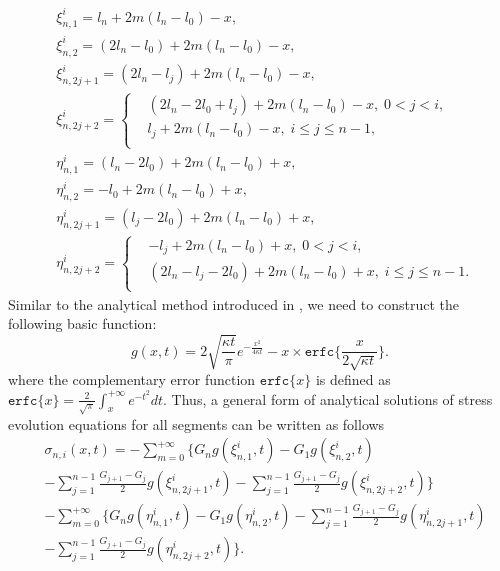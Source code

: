 \begin{equation} \label{generalNotations}
\begin{split}
&\xi_{n,1}^{i}=l_n+2m(l_n-l_0)-x,\\
&\xi_{n,2}^{i}=(2l_n-l_0)+2m(l_n-l_0)-x,\\
&\xi_{n,2j+1}^{i}=(2l_n-l_j)+2m(l_n-l_0)-x,\\
&\xi_{n,2j+2}^{i}=\left\{
   \begin{aligned}
   &(2l_n-2l_0+l_j)+2m(l_n-l_0)-x,\;0<j<i,  \\
   &l_j+2m(l_n-l_0)-x,\;i\leq j\leq n-1, \\
      \end{aligned}
   \right. \\
&\eta_{n,1}^{i}=(l_n-2l_0)+2m(l_n-l_0)+x,\\
&\eta_{n,2}^{i}=-l_0+2m(l_n-l_0)+x,\\
&\eta_{n,2j+1}^{i}=(l_j-2l_0)+2m(l_n-l_0)+x,\\
&\eta_{n,2j+2}^{i}=\left\{
   \begin{aligned}
   &-l_j+2m(l_n-l_0)+x,\;0<j<i,  \\
   &(2l_n-l_j-2l_0)+2m(l_n-l_0)+x,\;i\leq j \leq n-1. \\
   \end{aligned}
   \right.
\end{split}
\end{equation}
Similar to the analytical method introduced in \cite{}, we need to construct the following basic function:
\begin{equation} \label{general_basisFunc}
g(x,t)=2\sqrt{\frac{\kappa t}{\pi}}e^{-\frac{x^2}{4\kappa
t}}-x\times\texttt{erfc}\{\frac{x}{2\sqrt{\kappa t}}\}.
\end{equation}
where the complementary error function $\texttt{erfc}\{x\}$ is defined as $\texttt{erfc}\{x\}=\frac{2}{\sqrt{\pi}}\int_x^{+\infty}e^{-t^2}dt$. Thus, a general form of analytical solutions of stress evolution equations for all segments can be written as follows
\begin{equation} \label{eq:general_solution}
\begin{split}
&\sigma_{n,i}(x,t)=-\sum\limits_{m=0}^{+\infty}\{G_ng(\xi_{n,1}^{i},t)-G_1g(\xi_{n,2}^{i},t)\\
&-\sum\limits_{j=1}^{n-1}\frac{G_{j+1}-G_j}{2}g(\xi_{n,2j+1}^{i},t)-\sum\limits_{j=1}^{n-1}\frac{G_{j+1}-G_j}{2}g(\xi_{n,2j+2}^{i},t)\}\\
&-\sum\limits_{m=0}^{+\infty}\{G_ng(\eta_{n,1}^{i},t)-G_1g(\eta_{n,2}^{i},t)-\sum\limits_{j=1}^{n-1}\frac{G_{j+1}-G_j}{2}g(\eta_{n,2j+1}^{i},t)\\
&-\sum\limits_{j=1}^{n-1}\frac{G_{j+1}-G_j}{2}g(\eta_{n,2j+2}^{i},t)\}.
 \end{split}
 \end{equation} 



